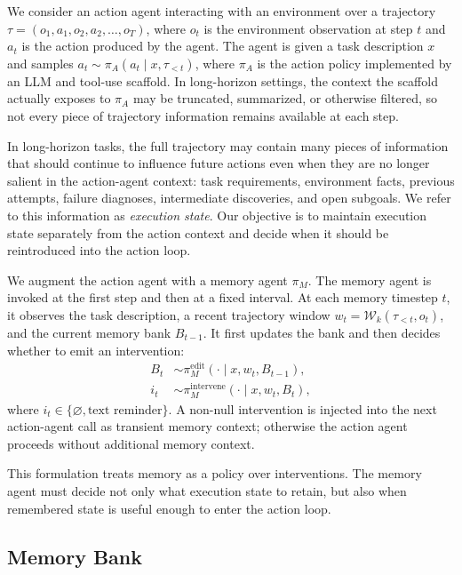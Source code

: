 We consider an action agent interacting with an environment over a trajectory
$\tau = (o_1, a_1, o_2, a_2, \ldots, o_T)$, where $o_t$ is the environment
observation at step $t$ and $a_t$ is the action produced by the agent. The
agent is given a task description $x$ and samples
$a_t \sim \pi_A(a_t \mid x, \tau_{<t})$, where $\pi_A$ is the action policy
implemented by an LLM and tool-use scaffold. In long-horizon settings, the
context the scaffold actually exposes to $\pi_A$ may be truncated, summarized,
or otherwise filtered, so not every piece of trajectory information remains
available at each step.

In long-horizon tasks, the full trajectory may contain many pieces of information
that should continue to influence future actions even when they are no longer
salient in the action-agent context: task requirements, environment facts, previous attempts,
failure diagnoses, intermediate discoveries, and open subgoals. We refer to this
information as \emph{execution state}. Our objective is to maintain execution
state separately from the action context and decide when it should be reintroduced
into the action loop.

We augment the action agent with a memory agent $\pi_M$. The memory agent is
invoked at the first step and then at a fixed interval. At each memory timestep
$t$, it observes the task description, a recent trajectory window
$w_t = \mathcal{W}_k(\tau_{<t}, o_t)$, and the current memory bank $B_{t-1}$.
It first updates the bank and then decides whether to emit an intervention:
\[
\begin{aligned}
B_t &\sim \pi_M^{\mathrm{edit}}(\cdot \mid x, w_t, B_{t-1}), \\
i_t &\sim \pi_M^{\mathrm{intervene}}(\cdot \mid x, w_t, B_t),
\end{aligned}
\]
where $i_t \in \{\varnothing, \text{text reminder}\}$. A non-null intervention
is injected into the next action-agent call as transient memory context;
otherwise the action agent proceeds without additional memory context.

This formulation treats memory as a policy over interventions. The memory agent
must decide not only what execution state to retain, but also when remembered
state is useful enough to enter the action loop.

\subsection{Memory Bank}

